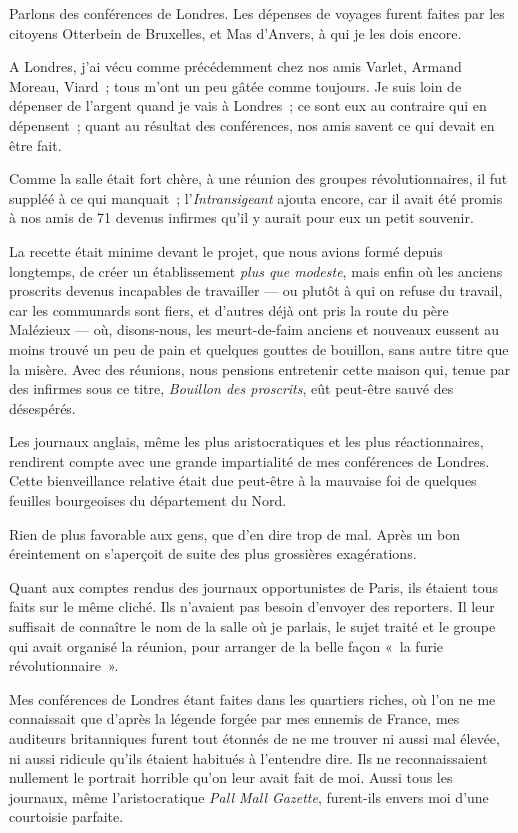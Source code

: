 \documentclass[french,twoside]{book} %
\begin{document}
\noindent Parlons des conférences de Londres. Les dépenses de voyages furent faites par les citoyens Otterbein de Bruxelles, et Mas d’Anvers, à qui je les dois encore.\par
A Londres, j’ai vécu comme précédemment chez nos amis Varlet, Armand Moreau, Viard ; tous m’ont un peu gâtée comme toujours. Je suis loin de dépenser de l’argent quand je vais à Londres ; ce sont eux au contraire qui en dépensent ; quant au résultat des conférences, nos amis savent ce qui devait en être fait.\par
Comme la salle était fort chère, à une réunion des groupes révolutionnaires, il fut suppléé à ce qui manquait ; l’\emph{Intransigeant} ajouta encore, car il avait été promis à nos amis de 71 devenus infirmes qu’il y aurait pour eux un petit souvenir.\par
La recette était minime devant le projet, que  nous avions formé depuis longtemps, de créer un établissement \emph{plus que modeste}, mais enfin où les anciens proscrits devenus incapables de travailler — ou plutôt à qui on refuse du travail, car les communards sont fiers, et d’autres déjà ont pris la route du père Malézieux — où, disons-nous, les meurt-de-faim anciens et nouveaux eussent au moins trouvé un peu de pain et quelques gouttes de bouillon, sans autre titre que la misère. Avec des réunions, nous pensions entretenir cette maison qui, tenue par des infirmes sous ce titre, \emph{Bouillon des proscrits}, eût peut-être sauvé des désespérés.\par
Les journaux anglais, même les plus aristocratiques et les plus réactionnaires, rendirent compte avec une grande impartialité de mes conférences de Londres. Cette bienveillance relative était due peut-être à la mauvaise foi de quelques feuilles bourgeoises du département du Nord.\par
Rien de plus favorable aux gens, que d’en dire trop de mal. Après un bon éreintement on s’aperçoit de suite des plus grossières exagérations.\par
Quant aux comptes rendus des journaux opportunistes de Paris, ils étaient tous faits sur le même cliché. Ils n’avaient pas besoin d’envoyer des reporters. Il leur suffisait de connaître le nom de la salle où je parlais, le sujet traité et le  groupe qui avait organisé la réunion, pour arranger de la belle façon « la furie révolutionnaire ».\par
Mes conférences de Londres étant faites dans les quartiers riches, où l’on ne me connaissait que d’après la légende forgée par mes ennemis de France, mes auditeurs britanniques furent tout étonnés de ne me trouver ni aussi mal élevée, ni aussi ridicule qu’ils étaient habitués à l’entendre dire. Ils ne reconnaissaient nullement le portrait horrible qu’on leur avait fait de moi. Aussi tous les journaux, même l’aristocratique \emph{Pall Mall Gazette}, furent-ils envers moi d’une courtoisie parfaite.\par
\end{document}
